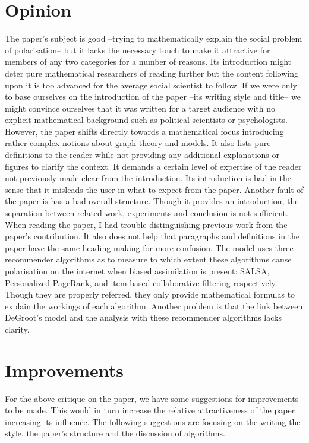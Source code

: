 \documentclass[14]{article}
\begin{document}
\section{Opinion}
The paper's subject is good --trying to mathematically explain the social problem of polarisation-- but it lacks the necessary touch to make it attractive for members of any two categories for a number of reasons. Its introduction might deter pure mathematical researchers of reading further but the content following upon it is too advanced for the average social scientist to follow.
\newline
If we were only to base ourselves on the introduction of the paper --its writing style and title-- we might convince ourselves that it was written for a target audience with no explicit mathematical background such as political scientists or psychologists. However, the paper shifts directly towards a mathematical focus introducing rather complex notions about graph theory and models. It also lists pure definitions to the reader while not providing any additional explanations or figures to clarify the context. It demands a certain level of expertise of the reader not previously made clear from the introduction. Its introduction is bad in the sense that it misleads the user in what to expect from the paper. 
\newline
Another fault of the paper is has a bad overall structure. Though it provides an introduction, the separation between related work, experiments and conclusion is not sufficient. When reading the paper, I had trouble distinguishing previous work from the paper's contribution. It also does not help that paragraphs and definitions in the paper have the same heading making for more confusion.
\newline
The model uses three recommender algorithms as to measure to which extent these algorithms cause polarisation on the internet when biased assimilation is present: SALSA\cite{lempel2001salsa}, Personalized PageRank\cite{page1999pagerank}, and item-based collaborative filtering\cite{linden2003amazon} respectively. Though they are properly referred, they only provide mathematical formulas to explain the workings of each algorithm. Another problem is that the link between DeGroot's model and the analysis with these recommender algorithms lacks clarity.

\section{Improvements}
For the above critique on the paper, we have some suggestions for improvements to be made. This would in turn increase the relative attractiveness of the paper increasing its influence. The following suggestions are focusing on the writing the style, the paper's structure and the discussion of algorithms.
\end{document}
